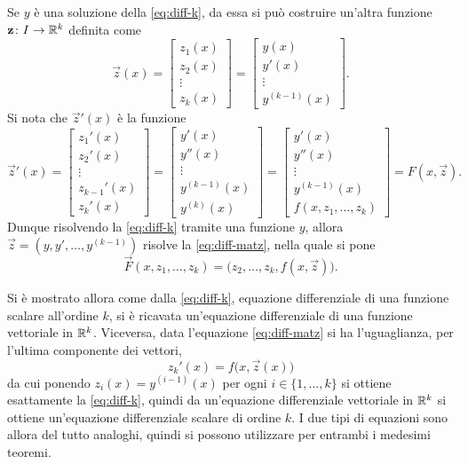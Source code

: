 Se $y$ è una soluzione della \eqref{eq:diff-k}, da essa si può costruire un'altra funzione $\mathbf{z}\colon I\to\mathbb{R}^k$ definita come
\[
\vec z(x)=
\begin{bmatrix}z_1(x)\\z_2(x)\\\vdots\\z_k(x)\end{bmatrix}=
\begin{bmatrix}y(x)\\y'(x)\\\vdots\\y^{(k-1)}(x)\end{bmatrix}.
\]
Si nota che $\vec z'(x)$ è la funzione
\begin{equation} \label{eq:diff-matz}
\vec z'(x)=
\begin{bmatrix}z_1'(x)\\z_2'(x)\\\vdots\\z_{k-1}'(x)\\z_k'(x)\end{bmatrix}=
\begin{bmatrix}y'(x)\\y''(x)\\\vdots\\y^{(k-1)}(x)\\y^{(k)}(x)\end{bmatrix}=
\begin{bmatrix}y'(x)\\y''(x)\\\vdots\\y^{(k-1)}(x)\\f(x,z_1,\dots,z_k)\end{bmatrix}=
F(x,\vec z).
\end{equation}
Dunque risolvendo la \eqref{eq:diff-k} tramite una funzione $y$, allora $\vec z=(y,y',\dots,y^{(k-1)})$ risolve la \eqref{eq:diff-matz}, nella quale si pone
\begin{equation} \label{eq:diff-F}
\vec F(x,z_1,\dots,z_k)=\big(z_2,\dots,z_k,f(x,\vec z)\big).
\end{equation}

Si è mostrato allora come dalla \eqref{eq:diff-k}, equazione differenziale di una funzione scalare all'ordine $k$, si è ricavata un'equazione differenziale di una funzione vettoriale in $\mathbb{R}^k$. Viceversa, data l'equazione \eqref{eq:diff-matz} si ha l'uguaglianza, per l'ultima componente dei vettori, 
\[
z_k'(x)=f\big(x,\vec z(x)\big)
\]
da cui ponendo $z_i(x)=y^{(i-1)}(x)$ per ogni $i\in\{1,\dots,k\}$ si ottiene esattamente la \eqref{eq:diff-k}, quindi da un'equazione differenziale vettoriale in $\mathbb{R}^k$ si ottiene un'equazione differenziale scalare di ordine $k$. I due tipi di equazioni sono allora del tutto analoghi, quindi si possono utilizzare per entrambi i medesimi teoremi.

